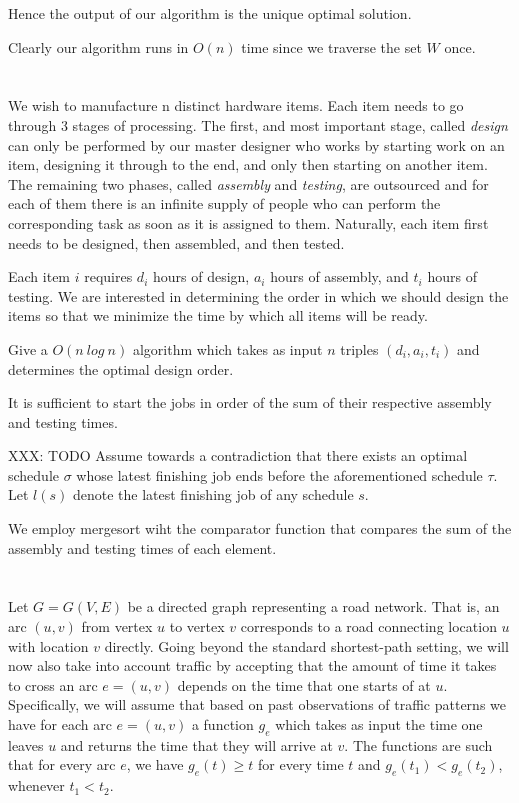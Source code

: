 \documentclass{amsart}
\theoremstyle{definition}
\theoremstyle{remark}
\numberwithin{equation}{section}
\begin{document}
Hence the output of our algorithm is the unique optimal solution.

\rmkstar Clearly our algorithm runs in $O(n)$ time since we traverse the
set $W$ once.

\section{}

We wish to manufacture n distinct hardware items. Each item needs to go
through 3 stages of processing. The first, and most important stage,
called \textit{design} can only be performed by our master designer who works
by starting work on an item, designing it through to the end, and only
then starting on another item. The remaining two phases, called \textit{assembly}
and \textit{testing}, are outsourced and for each of them there is an infinite
supply of people who can perform the corresponding task as soon as it is
assigned to them. Naturally, each item first needs to be designed, then
assembled, and then tested.

Each item $i$ requires $d_i$ hours of design, $a_i$ hours of assembly, and $t_i$
hours of testing. We are interested in determining the order in which we
should design the items so that we minimize the time by which all items
will be ready.

Give a $O(n\ log\ n)$ algorithm which takes as input $n$ triples
$(d_i,a_i,t_i)$ and determines the optimal design order.

\claimstar It is sufficient to start the jobs in order of the sum of
their respective assembly and testing times.

XXX: TODO
\proof Assume towards a contradiction that there exists an optimal
schedule $\sigma$ whose latest finishing job ends before the
aforementioned schedule $\tau$. Let $l (s)$ denote the latest
finishing job of any schedule $s$.

\alg We employ mergesort wiht the comparator function that compares
the sum of the assembly and testing times of each element.

\section{} Let $G = G(V, E)$ be a directed graph representing a
road network. That is, an arc $(u, v)$ from vertex $u$ to vertex
$v$ corresponds to a road connecting location $u$ with location $v$
directly. Going beyond the standard shortest-path setting, we will now
also take into account traffic by accepting that the amount of time it
takes to cross an arc $e = (u, v)$ depends on the time that one starts
of at $u$. Specifically, we will assume that based on past observations
of traffic patterns we have for each arc $e = (u, v)$ a function $g_e$
which takes as input the time one leaves $u$ and returns the time that
they will arrive at $v$. The functions are such that for every arc $e$,
we have $g_e(t) \geq t$ for every time $t$ and $g_e(t_1) < g_e(t_2)$,
whenever $t_1 < t_2$.
\end{document}
